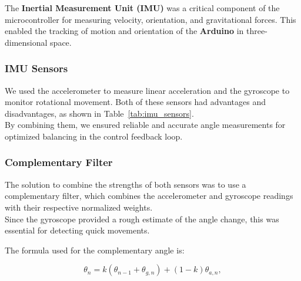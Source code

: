 \documentclass{article}
\begin{document}
\begin{minipage}{\linewidth}
    The \textbf{Inertial Measurement Unit (IMU)} was a critical component of the microcontroller for measuring velocity, orientation, and
    gravitational forces. This enabled the tracking of motion and orientation of the \textbf{Arduino} in three-dimensional space.
\end{minipage}

\subsubsection{IMU Sensors}
\begin{minipage}{\linewidth}
    We used the accelerometer to measure linear acceleration and the gyroscope to monitor rotational
    movement. Both of these sensors had advantages and disadvantages, as shown in Table~\ref{tab:imu_sensors}. \\

    By combining them, we ensured reliable and accurate angle measurements for optimized balancing in the control feedback loop.
\end{minipage}

\subsubsection{Complementary Filter}


\begin{minipage}{\linewidth}
    The solution to combine the strengths of both sensors was to use a complementary filter,
    which combines the accelerometer and gyroscope readings with their respective normalized weights. \\

    Since the gyroscope provided a rough estimate of the angle change, this was essential for detecting quick movements. \\
\end{minipage}

The formula used for the complementary angle is:

\[
\theta_n = k(\theta_{n-1} + \theta_{g,n}) + (1-k)\theta_{a,n},
\]
\end{document}
